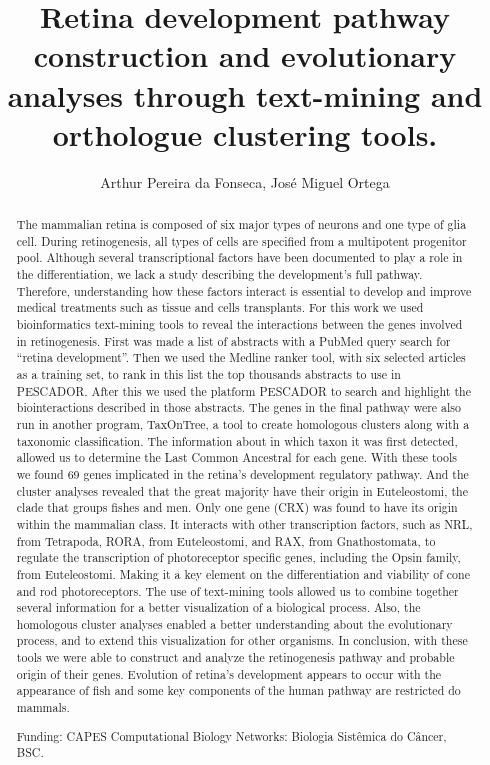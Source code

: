 \documentclass[twoside]{article}
\title{\vspace{-15mm}\fontsize{24pt}{10pt}\selectfont\textbf{ Retina development pathway construction and evolutionary analyses through text-mining and orthologue clustering tools. }} %
\author{ Arthur Pereira da Fonseca, Jos\'e Miguel Ortega }
\affil{ Universidade Federal de Minas Gerais }
\date{}
\begin{document}
  
  
  \maketitle %
  
  
  \thispagestyle{fancy} %
  
  
  \begin{abstract}
  The mammalian retina is composed of six major types of neurons and one type of glia cell. During retinogenesis,  all types of cells are specified from a multipotent progenitor pool. Although several transcriptional factors have been documented to play a role in the differentiation,  we lack a study describing the development’s full pathway. Therefore,  understanding how these factors interact is essential to develop and improve medical treatments such as tissue and cells transplants.
For this work we used bioinformatics text-mining tools to reveal the interactions between the genes involved in retinogenesis. First was made a list of abstracts with a PubMed query search for “retina development”. Then we used the Medline ranker tool,  with six selected articles as a training set,  to rank in this list the top thousands abstracts to use in PESCADOR.  After this we used the platform PESCADOR to search and highlight the biointeractions described in those abstracts.  The genes in the final pathway were also run in another program,  TaxOnTree,  a tool to create homologous clusters along with a taxonomic classification. The information about in which taxon it was first detected,  allowed us to determine the Last Common Ancestral for each gene.
With these tools we found 69 genes implicated in the retina’s development regulatory pathway. And the cluster analyses revealed that the great majority have their origin in Euteleostomi,  the clade that groups fishes and men. Only one gene (CRX) was found to have its origin within the mammalian class. It interacts with other transcription factors,  such as NRL,  from Tetrapoda,  RORA,  from Euteleostomi,  and RAX,  from Gnathostomata,  to regulate the transcription of photoreceptor specific genes,  including the Opsin family,  from Euteleostomi. Making it a key element on the differentiation and viability of cone and rod photoreceptors. 
The use of text-mining tools allowed us to combine together several information for a better visualization of a biological process. Also,  the homologous cluster analyses enabled a better understanding about the evolutionary process,  and to extend this visualization for other organisms. In conclusion,  with these tools we were able to construct and analyze the retinogenesis pathway and probable origin of their genes. Evolution of retina’s development appears to occur with the appearance of fish and some key components of the human pathway are restricted do mammals.
  
  Funding: CAPES Computational Biology Networks: Biologia Sist\^emica do C\^ancer,  BSC. \\ 
  \end{abstract}
  
\end{document}
